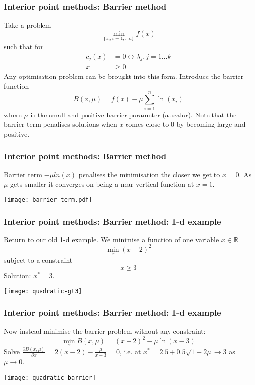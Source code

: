 \documentclass[10pt,aspectratio=169,dvipsnames]{beamer}
\def\l{\lambda}
\def\m{\mu}
\def\d{\partial}
\begin{document}
\begin{frame}
  \frametitle{Interior point methods: Barrier method}

 Take a problem
  \begin{equation*}
    \min_{\{x_i, i=1,\dots n\}} f(x)
  \end{equation*}
such that for
\begin{align*}
  c_j(x) & = 0 \leftrightarrow \l_j, j = 1\dots k \\
  x & \geq 0
\end{align*}
Any optimisation problem can be brought into this form. Introduce the \alert{barrier function}
\begin{equation*}
 B(x,\mu) = f(x) - \m \sum_{i=1}^n \ln(x_i)
\end{equation*}
where $\mu$ is the small and positive \alert{barrier parameter} (a scalar). Note that the barrier term penalises solutions when $x$ comes close to 0 by becoming large and positive.
\end{frame}


\begin{frame}
  \frametitle{Interior point methods: Barrier method}

  Barrier term $-\m ln(x)$ penalises the minimisation the closer we get to $x=0$. As $\mu$ gets smaller it converges on being a near-vertical function at $x=0$.

  \centering
  \texttt{[image: barrier-term.pdf]}


\end{frame}


\begin{frame}
  \frametitle{Interior point methods: Barrier method: 1-d example}

  Return to our old 1-d example. We minimise a function of one variable $x \in \mathbb{R}$
  \begin{equation*}
      \min_x (x-2)^2
  \end{equation*}
  subject to a constraint
  \begin{equation*}
       x \geq 3
  \end{equation*}
  Solution: $x^* = 3$.

  \centering
  \texttt{[image: quadratic-gt3]}
\end{frame}



\begin{frame}
  \frametitle{Interior point methods: Barrier method: 1-d example}

  Now instead minimise the barrier problem without any constraint:
  \begin{equation*}
     \min_x B(x,\mu) = (x-2)^2 - \m  \ln(x-3)
  \end{equation*}
  Solve $\frac{\d B(x,\mu)}{\d x} = 2(x-2) -\frac{\mu}{x-3} = 0$, i.e. at $x^* = 2.5 + 0.5\sqrt{1+2\mu} \to 3$ as $\mu \to 0$.

  \centering
  \texttt{[image: quadratic-barrier]}
\end{frame}
\end{document}
